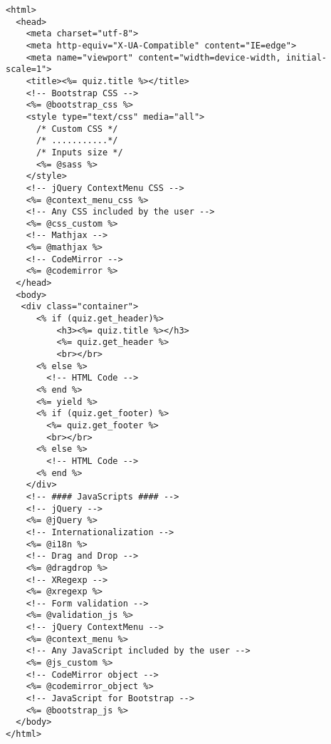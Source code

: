 \begin{lstlisting}
<html>
  <head>
    <meta charset="utf-8">
    <meta http-equiv="X-UA-Compatible" content="IE=edge">
    <meta name="viewport" content="width=device-width, initial-scale=1">
    <title><%= quiz.title %></title>
    <!-- Bootstrap CSS -->
    <%= @bootstrap_css %>
    <style type="text/css" media="all">
      /* Custom CSS */
      /* ...........*/
      /* Inputs size */
      <%= @sass %>
    </style>
    <!-- jQuery ContextMenu CSS -->
    <%= @context_menu_css %>
    <!-- Any CSS included by the user -->
    <%= @css_custom %>
    <!-- Mathjax -->
    <%= @mathjax %>
    <!-- CodeMirror -->
    <%= @codemirror %>
  </head>
  <body>
   <div class="container">
      <% if (quiz.get_header)%>
          <h3><%= quiz.title %></h3>
          <%= quiz.get_header %>
          <br></br>
      <% else %>
        <!-- HTML Code -->
      <% end %>
      <%= yield %>
      <% if (quiz.get_footer) %>
        <%= quiz.get_footer %>
        <br></br>
      <% else %>
        <!-- HTML Code -->
      <% end %>
    </div>
    <!-- #### JavaScripts #### -->
    <!-- jQuery -->
    <%= @jQuery %>
    <!-- Internationalization -->
    <%= @i18n %>
    <!-- Drag and Drop -->
    <%= @dragdrop %>
    <!-- XRegexp -->
    <%= @xregexp %>
    <!-- Form validation -->
    <%= @validation_js %>
    <!-- jQuery ContextMenu -->
    <%= @context_menu %>
    <!-- Any JavaScript included by the user -->
    <%= @js_custom %>
    <!-- CodeMirror object -->
    <%= @codemirror_object %>
    <!-- JavaScript for Bootstrap -->
    <%= @bootstrap_js %>
  </body>
</html>
\end{lstlisting}
